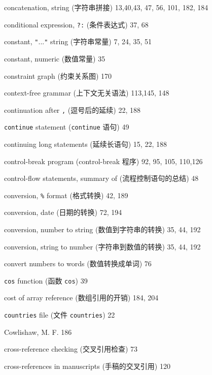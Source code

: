 \begin{multicols}{2}
\hangindent=2pc  concatenation, string (字符串拼接) 13,40,43, 47, 56, 101, 182, 184

\hangindent=2pc  conditional expression, \verb'?:' (条件表达式) 37, 68

\hangindent=2pc  constant, \verb'"'...\verb'"' string
(字符串常量) 7, 24, 35, 51

\hangindent=2pc  constant, numeric (数值常量) 35

\hangindent=2pc  constraint graph (约束关系图) 170

\hangindent=2pc  context-free grammar (上下文无关语法) 113,145, 148

\hangindent=2pc  continuation after \verb',' (逗号后的延续) 22, 188

\hangindent=2pc  \verb'continue' statement (\verb'continue'
语句) 49

\hangindent=2pc  continuing long statements (延续长语句) 15, 22, 188

\hangindent=2pc  control-break program (control-break 程序) 92, 95, 105, 110,126

\hangindent=2pc  control-flow statements, summary of
(流程控制语句的总结) 48

\hangindent=2pc  conversion, \verb'%' format (格式转换) 42, 189

\hangindent=2pc  conversion, date (日期的转换) 72, 194

\hangindent=2pc  conversion, number to string
(数值到字符串的转换) 35, 44, 192

\hangindent=2pc  conversion, string to number
(字符串到数值的转换) 35, 44, 192

\hangindent=2pc  convert numbers to words (数值转换成单词) 76

\hangindent=2pc  \verb'cos' function (函数 \verb'cos') 39

\hangindent=2pc  cost of array reference (数组引用的开销) 184, 204

\hangindent=2pc  \verb'countries' file (文件 \verb'countries') 22

\hangindent=2pc  Cowlishaw, M. F. 186

\hangindent=2pc  cross-reference checking (交叉引用检查) 73

\hangindent=2pc  cross-references in manuscripts
(手稿的交叉引用) 120


\end{multicols}
